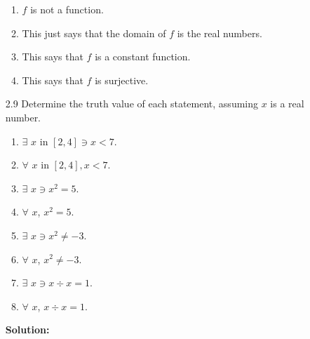 \begin{enumerate}
      \begin{enumerate}
         \item $f$ is not a function.
         \item This just says that the domain of $f$ is the real numbers.
         \item This says that $f$ is a constant function.
         \item This says that $f$ is surjective.
      \end{enumerate}
   \item[2.9] Determine the truth value of each statement, assuming $x$ is a 
              real number.
      \begin{enumerate}
         \item $\exists$ $x$ in $[2,4] \ni x < 7$.
         \item $\forall$ $x$ in $[2,4], x < 7$.
         \item $\exists$ $x \ni x^2 = 5$.
         \item $\forall$ $x$, $x^2 = 5$.
         \item $\exists$ $x \ni x^2 \neq -3$.
         \item $\forall$ $x$, $x^2 \neq -3$.
         \item $\exists$ $x \ni x \div x = 1$.
         \item $\forall$ $x$, $x \div x = 1$.
      \end{enumerate}

      \textbf{Solution:}
      

\end{enumerate}
